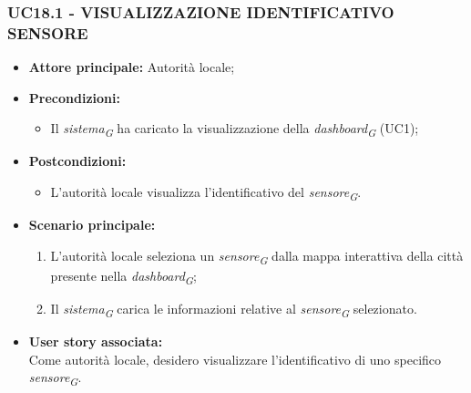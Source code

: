 \subsubsection{UC18.1 - VISUALIZZAZIONE IDENTIFICATIVO SENSORE}
\begin{itemize}
    \item \textbf{Attore principale:} Autorità locale;
    \item \textbf{Precondizioni:}
        \begin{itemize}
            \item Il \textit{sistema}\textsubscript{\textit{G}} ha caricato la visualizzazione della \textit{dashboard}\textsubscript{\textit{G}} (UC1);
        \end{itemize}
    \item \textbf{Postcondizioni:}
        \begin{itemize}
            \item L'autorità locale visualizza l'identificativo del \textit{sensore}\textsubscript{\textit{G}}.
        \end{itemize}
    \item \textbf{Scenario principale:}
        \begin{enumerate}
            \item L'autorità locale seleziona un \textit{sensore}\textsubscript{\textit{G}} dalla mappa interattiva della città presente nella \textit{dashboard}\textsubscript{\textit{G}};
            \item Il \textit{sistema}\textsubscript{\textit{G}} carica le informazioni relative al \textit{sensore}\textsubscript{\textit{G}} selezionato.
        \end{enumerate}
    \item \textbf{User story associata:} \\
        Come autorità locale, desidero visualizzare l'identificativo di uno specifico \textit{sensore}\textsubscript{\textit{G}}.
\end{itemize}